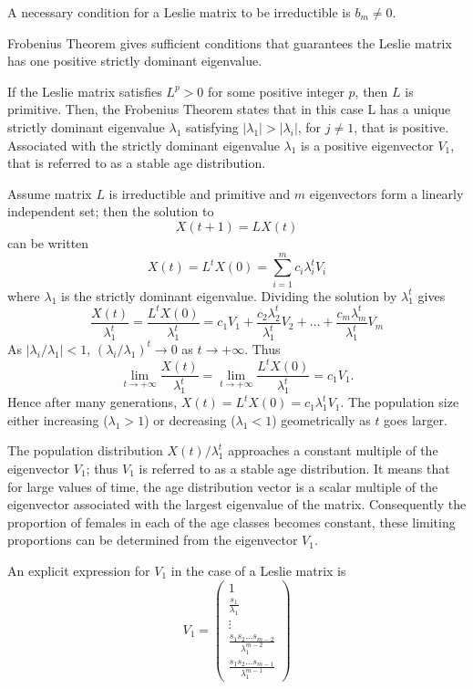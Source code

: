 A necessary condition for a Leslie matrix to be irreductible is $b_m\not =0$.


Frobenius Theorem gives sufficient conditions that guarantees the Leslie matrix has one positive strictly dominant eigenvalue.


If the Leslie matrix satisfies $L^p>0$ for some positive integer $p$, then $L$ is primitive. Then, the Frobenius Theorem states that in this case L has a unique strictly dominant eigenvalue $\lambda _1$ satisfying $|\lambda _1|>|\lambda _i|$, for $j\not =1$, that is positive. Associated with the strictly dominant eigenvalue $\lambda _1$ is a positive eigenvector $V_1$, that is referred to as a stable age distribution.


Assume matrix $L$ is irreductible and primitive and $m$ eigenvectors form a linearly independent set; then the solution to
$$X(t+1)=LX(t)$$
can be written
$$X(t)=L^tX(0)=\sum_{i=1}^m c_i \lambda _i ^t V_i$$
where $\lambda _1$ is the strictly dominant eigenvalue. Dividing the solution by $\lambda _1^t$ gives
$$\frac{X(t)}{\lambda _1^t}=\frac{L^tX(0)}{\lambda _1^t}=c_1 V_1 + \frac{c_2 \lambda _2 ^t}{\lambda _1^t} V_2+\dots + \frac{c_m \lambda _m ^t}{\lambda _1^t} V_m $$
As $|\lambda _i/\lambda_1|<1$, $(\lambda _i/\lambda_1)^t\rightarrow 0$ as $t\rightarrow +\infty$. Thus
$$\lim_{t\rightarrow +\infty} \frac{X(t)}{\lambda _1^t}=\lim_{t\rightarrow +\infty}  \frac{L^tX(0)}{\lambda _1^t}=c_1V_1 .$$
Hence after many generations, $X(t)=L^tX(0)=c_1\lambda _1^tV_1$. The population size either increasing ($\lambda _1 >1$) or decreasing ($\lambda _1 <1$) geometrically as $t$ goes larger.

The population distribution $X(t)/\lambda _1 ^t$ approaches a constant multiple of the eigenvector $V_1$; thus $V_1$ is referred to as a stable age distribution. It means that for large values of time, the age distribution vector is a scalar multiple of the eigenvector associated with the largest eigenvalue of the matrix. Consequently the proportion of females in each of the age classes becomes constant, these limiting proportions can be determined from the eigenvector $V_1$.

An explicit expression for $V_1$ in the case of a Leslie matrix is \cite{Pielou1977}
\begin{equation}
\label{eq:Eigenvector}
V_1=\left (\begin{array}{c}
1\\
\frac{s_1}{\lambda _1}\\
\vdots\\
\frac{s_1s_2\dots s_{m-2}}{\lambda_1^{m-2}}\\
\frac{s_1s_2\dots s_{m-1}}{\lambda_1^{m-1}}
\end{array}\right )
\end{equation}


